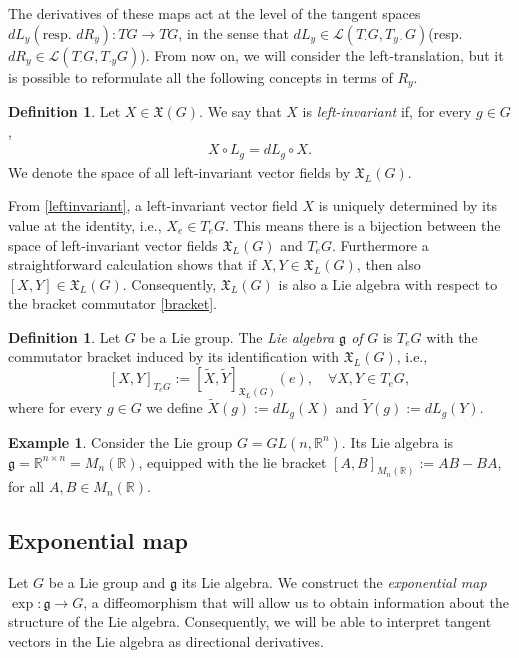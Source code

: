 \documentclass[12pt,oneside,a4paper]{book}
\numberwithin{equation}{section}     %
\theoremstyle{plain}
\theoremstyle{definition}
\newtheorem{definition}[theorem]{Definition}
\newtheorem{example}[theorem]{Example}
\newcommand{\R}{{\mathbb R}}
\newcommand{\Rn}{{\R}^n}
\begin{document}
The derivatives of these maps act at the level of the tangent spaces $dL_y(\text{resp. }dR_y):TG\rightarrow TG$, in the sense that $dL_y\in\mathcal{L}(T_{\cdot}G,T_{y\cdot}G)$(resp. $dR_y\in\mathcal{L}(T_{\cdot}G,T_{\cdot y}G)$). From now on, we will consider the left-translation, but it is possible to reformulate all the following concepts in terms of $R_y$. 
\begin{definition}
	Let $X\in\mathfrak{X}(G)$. We say that $X$ is \textit{left-invariant} if, for every $g\in G$,
	\begin{align}\label{leftinvariant}
	X\circ L_g=dL_g\circ X.
	\end{align}
	We denote the space of all left-invariant vector fields by $\mathfrak{X}_L(G)$.
\end{definition}
From \eqref{leftinvariant}, a left-invariant vector field $X$ is uniquely determined by its value at the identity, i.e., $X_{e}\in T_e G$. This means there is a bijection between the space of left-invariant vector fields $\mathfrak{X}_L(G)$ and $T_eG$. Furthermore a straightforward calculation shows that if $X,Y\in\mathfrak{X}_L(G)$, then also $[X,Y]\in\mathfrak{X}_L(G)$. Consequently, $\mathfrak{X}_L(G)$ is also a Lie algebra with respect to the bracket commutator \eqref{bracket}.
\begin{definition}
	Let $G$ be a Lie group. The \textit{Lie algebra $\mathfrak g$ of} $G$ is $T_e G$ with the commutator bracket induced by its identification with $\mathfrak{X}_L (G)$, i.e.,
	\[
	[X,Y]_{T_e G}:=[\tilde{X},\tilde{Y}]_{\mathfrak{X}_L(G)}(e),\quad\forall X,Y\in T_e G,
	\]
	where for every $g\in G$ we define $\tilde{X}(g):=dL_g(X)$ and $\tilde{Y}(g):=dL_g(Y)$.
\end{definition}
\begin{example}
	Consider the Lie group $G=GL(n,\Rn)$. Its Lie algebra is $\mathfrak{g}=\R^{n\times n}=M_n(\R)$, equipped with the lie bracket $[A,B]_{M_n(\R)}:=AB-BA$, for all $A,B\in M_n(\R)$.
\end{example}
\subsection{Exponential map}

Let $G$ be a Lie group and $\mathfrak{g}$ its Lie algebra. We construct the \textit{exponential map} $\exp:\mathfrak{g}\rightarrow G$, a diffeomorphism that will allow us to obtain information about the structure of the Lie algebra. Consequently, we will be able to interpret tangent vectors in the Lie algebra as directional derivatives.
\end{document}
